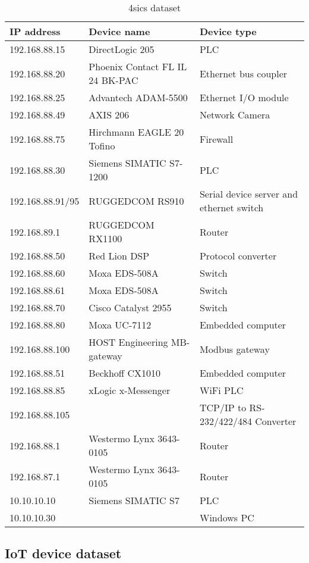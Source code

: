 \begin{table}[!h]
    \centering
    \begin{tabular}{l|l|l}
    \toprule
        IP address & Device name & Device type  \\
    \midrule
        192.168.88.15 & DirectLogic 205  & PLC \\
        192.168.88.20 & Phoenix Contact FL IL 24 BK-PAC & Ethernet bus coupler \\
        192.168.88.25 & Advantech ADAM-5500 & Ethernet I/O module \\
        192.168.88.49 & AXIS 206 & Network Camera\\
        192.168.88.75 & Hirchmann EAGLE 20 Tofino  & Firewall \\
192.168.88.30 & Siemens SIMATIC S7-1200 & PLC \\
192.168.88.91/95  & RUGGEDCOM RS910 & Serial device server  and ethernet switch \\
192.168.89.1  & RUGGEDCOM RX1100  & Router \\
192.168.88.50 & Red Lion DSP  & Protocol converter \\
192.168.88.60 & Moxa EDS-508A & Switch \\
192.168.88.61 & Moxa EDS-508A & Switch \\
192.168.88.70 & Cisco Catalyst 2955 & Switch \\
192.168.88.80 & Moxa UC-7112 & Embedded computer \\
192.168.88.100 & HOST Engineering MB-gateway & Modbus gateway \\
192.168.88.51 & Beckhoff CX1010 & Embedded computer \\
192.168.88.85 & xLogic x-Messenger  & WiFi PLC \\
192.168.88.105 & & TCP/IP to RS-232/422/484 Converter \\
192.168.88.1 & Westermo Lynx 3643-0105 & Router \\
192.168.87.1 & Westermo Lynx 3643-0105 & Router \\
10.10.10.10  & Siemens SIMATIC S7 & PLC \\
10.10.10.30  & & Windows PC \\
    \bottomrule        
    \end{tabular}
    \caption{4sics dataset}
    \label{tab:4sicsdataset}
\end{table}

\subsection{IoT device dataset}




